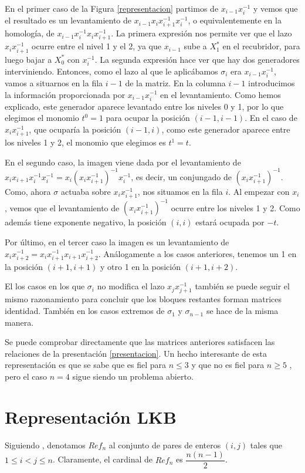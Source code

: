 \documentclass[TFG.tex]{subfiles}
\begin{document}
En el primer caso de la Figura \ref{representacion} partimos de $x_{i-1}x_i^{-1}$ y vemos que el resultado es un levantamiento de $x_{i-1}x_ix_{i+1}^{-1}x_i^{-1}$, o equivalentemente en la homología, de $x_{i-1}x_i^{-1}x_ix_{i+1}^{-1}$. La primera expresión nos permite ver que el lazo $x_ix_{i+1}^{-1}$ ocurre entre el nivel 1 y el 2, ya que $x_{i-1}$ sube a $X^*_1$ en el recubridor, para luego bajar a $X^*_0$ con $x_i^{-1}$. La segunda expresión hace ver que hay dos generadores interviniendo. Entonces, como el lazo al que le aplicábamos $\sigma_i$ era $x_{i-1}x_i^{-1}$, vamos a situarnos en la fila $i-1$ de la matriz. En la columna $i-1$ introducimos la información proporcionada por $x_{i-1}x_i^{-1}$ en el levantamiento. Como hemos explicado, este generador aparece levantado entre los niveles 0 y 1, por lo que elegimos el monomio $t^0=1$ para ocupar la posición $(i-1,i-1)$. En el caso de $x_ix_{i+1}^{-1}$, que ocuparía la posición $(i-1,i)$, como este generador aparece entre los niveles 1 y 2, el monomio que elegimos es $t^1=t$. 

En el segundo caso, la imagen viene dada por el levantamiento de $x_ix_{i+1}x_i^{-1}x_i^{-1}=x_i(x_ix_{i+1}^{-1})^{-1}x_i^{-1}$, es decir, un conjungado de $(x_ix_{i+1}^{-1})^{-1}$. Como, ahora $\sigma$ actuaba sobre $x_ix_{i+1}^{-1}$, nos situamos en la fila $i$. Al empezar con $x_i$, vemos que el levantamiento de $(x_ix_{i+1}^{-1})^{-1}$ ocurre entre los niveles 1 y 2. Como además tiene exponente negativo, la posición $(i,i)$ estará ocupada por $-t$. 

Por último, en el tercer caso la imagen es un levantamiento de $x_ix_{i+2}^{-1}=x_ix_{i+1}^{-1}x_{i+1}x_{i+2}^{-1}$. Análogamente a los casos anteriores, tenemos un 1 en la posición $(i+1,i+1)$ y otro 1 en la posición $(i+1,i+2)$. 

El los casos en los que $\sigma_i$ no modifica el lazo $x_jx_{j+1}^{-1}$ también se puede seguir el mismo razonamiento para concluir que los bloques restantes forman matrices identidad. También en los casos extremos de $\sigma_1$ y $\sigma_{n-1}$ se hace de la misma manera.

Se puede comprobar directamente que las matrices anteriores satisfacen las relaciones de la presentación \ref{presentacion}. Un hecho interesante de esta representación es que se sabe que es fiel para $n\leq 3$ \cite{Birman} y que no es fiel para $n\geq 5$ \cite{Bil}\cite{LP}, pero el caso $n=4$ sigue siendo un problema abierto.

\section{Representación LKB}
Siguiendo \cite{Krammer}, denotamos $Ref_n$ al conjunto de pares de enteros $(i,j)$ tales que $1\leq i<j\leq n$. Claramente, el cardinal de $Ref_n$ es $\dfrac{n(n-1)}{2}$.
\end{document}
